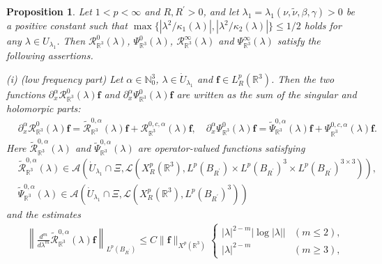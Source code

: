 \documentclass[dvipdfmx,12pt]{article}
\newtheorem{prop}[dfn]{Proposition}
\begin{document}
\begin{prop}\label{R-R3-prop2}
Let  $1<p<\infty$ and $R, R^\prime>0$, and let $\lambda_1=\lambda_1(\nu,\tilde{\nu},\beta,\gamma)>0$ be a positive constant such that $\max\{|\lambda^2/\kappa_1(\lambda)|, |\lambda^2/\kappa_2(\lambda)|\}\le 1/2$ holds for any $\lambda\in U_{\lambda_1}$. Then $\mathcal{R}_{\mathbb{R}^3}^0(\lambda)$, $\Psi_{\mathbb{R}^3}^0(\lambda)$, $\mathcal{R}_{\mathbb{R}^3}^\infty(\lambda)$ and $\Psi_{\mathbb{R}^3}^\infty(\lambda)$ satisfy the following assertions.


\vskip2mm

\noindent
{\rm (i) (low frequency part)} Let $\alpha\in\mathbb{N}_0^3$, $\lambda\in \Dot{U}_{\lambda_1}$ and $\mathbf{f}\in L_R^p(\mathbb{R}^3)$. Then the two functions $\partial_x^\alpha \mathcal{R}_{\mathbb{R}^3}^0(\lambda)\mathbf{f}$ and $\partial_x^\alpha \Psi_{\mathbb{R}^3}^0(\lambda)\mathbf{f}$ are written as the sum of the singular and  holomorpic parts:
\begin{align*}
&\partial_x^\alpha \mathcal{R}_{\mathbb{R}^3}^0(\lambda)\mathbf{f}=\widetilde{\mathcal{R}}_{\mathbb{R}^3}^{0,\alpha}(\lambda)\mathbf{f}+\mathcal{R}_{\mathbb{R}^3}^{0,c,\alpha}(\lambda)\mathbf{f}, \quad
\partial_x^\alpha \Psi_{\mathbb{R}^3}^0(\lambda)\mathbf{f}=\widetilde{\Psi}_{\mathbb{R}^3}^{0,\alpha}(\lambda)\mathbf{f}+\Psi_{\mathbb{R}^3}^{0,c,\alpha}(\lambda)\mathbf{f}. 
\end{align*}
Here $\widetilde{\mathcal{R}}_{\mathbb{R}^3}^{0,\alpha}(\lambda)$ and $\widetilde{\Psi}_{\mathbb{R}^3}^{0,\alpha}(\lambda)$ are operator-valued functions satisfying 
\begin{align*}
&\widetilde{\mathcal{R}}_{\mathbb{R}^3}^{0,\alpha}(\lambda)\in \mathcal{A}(\dot{U}_{\lambda_1}\cap \Xi, \mathcal{L}(X_R^{p}(\mathbb{R}^3),L^{p}(B_{R^\prime})\times L^{p}(B_{R^\prime})^3 \times L^{p}(B_{R^\prime})^{3\times3} ) ),\\
&\widetilde{\Psi}_{\mathbb{R}^3}^{0,\alpha}(\lambda)\in \mathcal{A}(\dot{U}_{\lambda_1}\cap \Xi, \mathcal{L}(X_R^{p}(\mathbb{R}^3),L^{p}(B_{R^\prime})^3 ) )
\end{align*}
and the estimates
\begin{align*}
&\left\|\frac{d^m }{d\lambda^m}\widetilde{\mathcal{R}}_{\mathbb{R}^3}^{0,\alpha}(\lambda)\mathbf{f} \right\|_{L^p(B_{R^\prime})}\leq C\|\mathbf{f}\|_{X^p(\mathbb{R}^3)}
\begin{cases}
|\lambda|^{2-m} \left|\log |\lambda|\right| & (m\le 2), \\
|\lambda|^{2-m} &(m\ge3),
\end{cases}  

\end{align*}
\end{prop}
\end{document}
